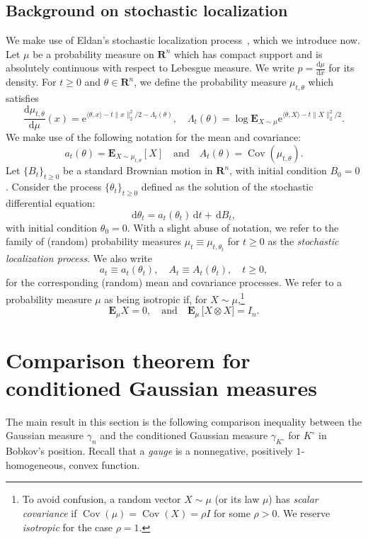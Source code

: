 \documentclass[11pt]{amsart}
\newcommand{\R}{\mathbf R}
\newcommand{\E}{\mathbf E}
\newcommand{\Cov}{\operatorname{Cov}}
\newcommand{\1}{\mathbf 1}
\newcommand{\e}{\mathrm{e}}
\newcommand{\ud}{\mathrm{d}}
\theoremstyle{plain}
\begin{document}
\subsection{Background on stochastic localization}

We make use of Eldan's stochastic localization process~\cite{Eld12, Eld13}, which we introduce now. Let $\mu$ be a probability measure on $\R^n$ which has compact support and is absolutely continuous with respect to Lebesgue measure. We write $p = \tfrac{\ud \mu}{\ud x}$ for its density. 
For $t \geq 0$ and $\theta \in \R^n$, we define the probability measure $\mu_{t, \theta}$ which satisfies
\[
\frac{\ud \mu_{t,\theta}}{\ud \mu}(x) = \e^{\langle \theta, x \rangle - t \|x\|_2^2/2 - 
\Lambda_t(\theta)}, 
\quad 
\Lambda_t(\theta) = 
\log \E_{X \sim \mu} \e^{\langle \theta, X\rangle - t \|X\|_2^2/2}.
\]
We make use of the following notation for the mean and covariance:
\[
a_t(\theta) = \E_{X \sim \mu_{t, \theta}}[X] 
\quad 
\mbox{and} \quad 
A_t(\theta) = \Cov(\mu_{t, \theta}).
\]
Let $\{B_t\}_{t \geq 0}$ be a standard Brownian motion in $\R^n$, with initial condition $B_0 = 0$. Consider the process $\{\theta_t\}_{t \geq 0}$ defined as the solution of the stochastic differential equation:
\[
\ud \theta_t = a_t(\theta_t)\, \ud t + \, \ud B_t,
\]
with initial condition $\theta_0 = 0$.
With a slight abuse of notation, we refer to the 
family of (random) probability measures $\mu_t \equiv \mu_{t, \theta_t}$ for $t \geq 0$ as the \emph{stochastic localization process}. We also write 
\[
a_t \equiv a_t(\theta_t), \quad A_t \equiv A_t(\theta_t), \quad t \geq 0,
\]
for the corresponding (random) mean and covariance processes. 
We refer to a probability measure $\mu$ as being isotropic if, for $X \sim\mu$,\footnote{To avoid confusion, a random vector $X \sim \mu$ (or its law $\mu$) has \emph{scalar covariance} if $\Cov(\mu)=\Cov(X) = \rho I$ for some $\rho > 0$. We reserve \emph{isotropic} for the case $\rho = 1$.}
\[
\E_{\mu} X = 0, \quad \mbox{and} \quad 
\E_{\mu}\, \Big[X \otimes X\Big] =  I_n.
\]

\section{Comparison theorem for conditioned Gaussian measures}

The main result in this section is the following comparison inequality between the Gaussian measure $\gamma_n$ and the conditioned Gaussian measure $\gamma_{K^\circ}$ for $K^\circ$ in Bobkov's position. Recall that a \emph{gauge} is a nonnegative, positively $1$-homogeneous, convex function.
\end{document}
